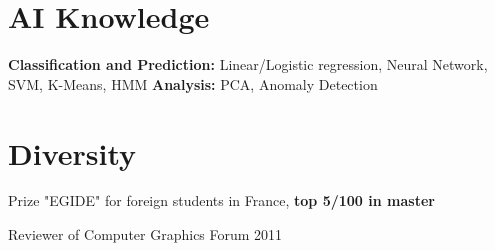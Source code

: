 \documentclass{tccv}
\begin{document}
\section{AI Knowledge}
\textbf{Classification and Prediction:} Linear/Logistic regression, Neural Network, SVM, K-Means, HMM
\textbf{Analysis:} PCA, Anomaly Detection


\section{Diversity}
\begin{factlist}
\item{}{Prize "EGIDE" for foreign students in France, \textbf{top 5/100 in master}}
\item{}{Reviewer of Computer Graphics Forum 2011}
\end{factlist}
\end{document}
